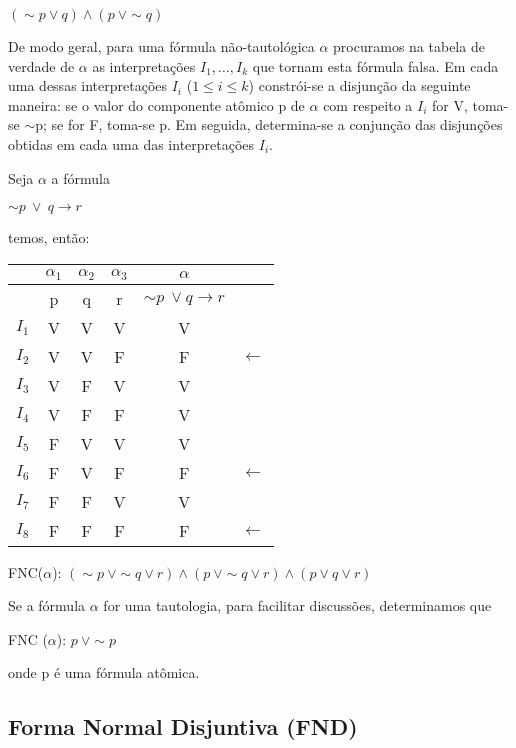 \centerline{$(\sim p \lor q) \land (p\ \lor \sim q)$}

De modo geral, para uma fórmula não-tautológica $\alpha$ procuramos na tabela de verdade de $\alpha$ as interpretações $I_1, \dots, I_k$ que tornam esta fórmula falsa.
Em cada uma dessas interpretações $I_i$ ($1 \leq i \leq k$) constrói-se a disjunção da seguinte maneira: se o valor do componente atômico p de $\alpha$ com respeito a $I_i$ for V, toma-se $\sim$p; se for F, toma-se p.
Em seguida, determina-se a conjunção das disjunções obtidas em cada uma das interpretações $I_i$.

\begin{exemplo}
    Seja $\alpha$ a fórmula

    \centerline{$\sim p\ \lor\ q \to r$}
\end{exemplo}

temos, então:

\bigskip
\begin{tabular}{c | c c c c l}
    & $\alpha_1$ & $\alpha_2$ & $\alpha_3$ & $\alpha$ & \\ \hline
    & p & q & r & $\sim p\ \lor q \to r$& \\
    $I_1$ & V & V & V & V & \\
    $I_2$ & V & V & F & F & $\longleftarrow$ \\
    $I_3$ & V & F & V & V & \\
    $I_4$ & V & F & F & V & \\
    $I_5$ & F & V & V & V & \\
    $I_6$ & F & V & F & F & $\longleftarrow$ \\
    $I_7$ & F & F & V & V & \\
    $I_8$ & F & F & F & F & $\longleftarrow$
\end{tabular}
\bigskip

\noindent FNC($\alpha$): $(\sim p\ \lor \sim q \lor r) \land (p\ \lor \sim q \lor r) \land (p \lor q \lor r)$

Se a fórmula $\alpha$ for uma tautologia, para facilitar discussões, determinamos que

\centerline{FNC ($\alpha$): $p\ \lor \sim p$}

onde p é uma fórmula atômica.

\pagebreak

\subsection{Forma Normal Disjuntiva (FND)}

